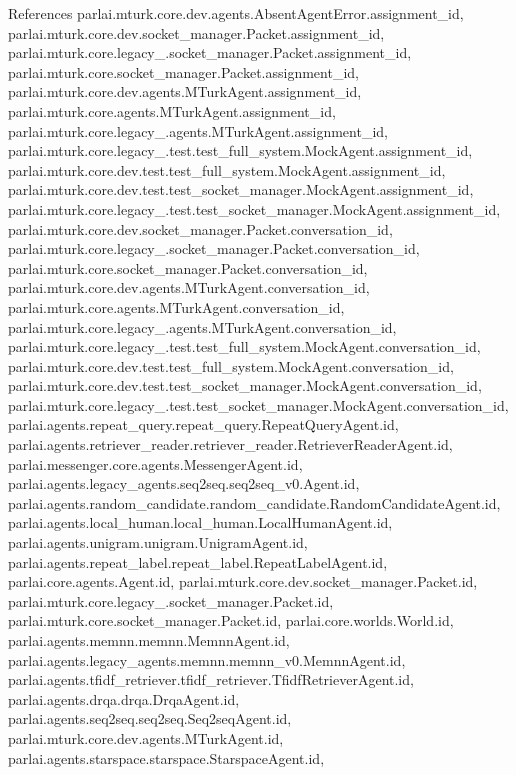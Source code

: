References parlai.\+mturk.\+core.\+dev.\+agents.\+Absent\+Agent\+Error.\+assignment\+\_\+id, parlai.\+mturk.\+core.\+dev.\+socket\+\_\+manager.\+Packet.\+assignment\+\_\+id, parlai.\+mturk.\+core.\+legacy\+\_.\+socket\+\_\+manager.\+Packet.\+assignment\+\_\+id, parlai.\+mturk.\+core.\+socket\+\_\+manager.\+Packet.\+assignment\+\_\+id, parlai.\+mturk.\+core.\+dev.\+agents.\+M\+Turk\+Agent.\+assignment\+\_\+id, parlai.\+mturk.\+core.\+agents.\+M\+Turk\+Agent.\+assignment\+\_\+id, parlai.\+mturk.\+core.\+legacy\+\_.\+agents.\+M\+Turk\+Agent.\+assignment\+\_\+id, parlai.\+mturk.\+core.\+legacy\+\_.\+test.\+test\+\_\+full\+\_\+system.\+Mock\+Agent.\+assignment\+\_\+id, parlai.\+mturk.\+core.\+dev.\+test.\+test\+\_\+full\+\_\+system.\+Mock\+Agent.\+assignment\+\_\+id, parlai.\+mturk.\+core.\+dev.\+test.\+test\+\_\+socket\+\_\+manager.\+Mock\+Agent.\+assignment\+\_\+id, parlai.\+mturk.\+core.\+legacy\+\_.\+test.\+test\+\_\+socket\+\_\+manager.\+Mock\+Agent.\+assignment\+\_\+id, parlai.\+mturk.\+core.\+dev.\+socket\+\_\+manager.\+Packet.\+conversation\+\_\+id, parlai.\+mturk.\+core.\+legacy\+\_.\+socket\+\_\+manager.\+Packet.\+conversation\+\_\+id, parlai.\+mturk.\+core.\+socket\+\_\+manager.\+Packet.\+conversation\+\_\+id, parlai.\+mturk.\+core.\+dev.\+agents.\+M\+Turk\+Agent.\+conversation\+\_\+id, parlai.\+mturk.\+core.\+agents.\+M\+Turk\+Agent.\+conversation\+\_\+id, parlai.\+mturk.\+core.\+legacy\+\_.\+agents.\+M\+Turk\+Agent.\+conversation\+\_\+id, parlai.\+mturk.\+core.\+legacy\+\_.\+test.\+test\+\_\+full\+\_\+system.\+Mock\+Agent.\+conversation\+\_\+id, parlai.\+mturk.\+core.\+dev.\+test.\+test\+\_\+full\+\_\+system.\+Mock\+Agent.\+conversation\+\_\+id, parlai.\+mturk.\+core.\+dev.\+test.\+test\+\_\+socket\+\_\+manager.\+Mock\+Agent.\+conversation\+\_\+id, parlai.\+mturk.\+core.\+legacy\+\_.\+test.\+test\+\_\+socket\+\_\+manager.\+Mock\+Agent.\+conversation\+\_\+id, parlai.\+agents.\+repeat\+\_\+query.\+repeat\+\_\+query.\+Repeat\+Query\+Agent.\+id, parlai.\+agents.\+retriever\+\_\+reader.\+retriever\+\_\+reader.\+Retriever\+Reader\+Agent.\+id, parlai.\+messenger.\+core.\+agents.\+Messenger\+Agent.\+id, parlai.\+agents.\+legacy\+\_\+agents.\+seq2seq.\+seq2seq\+\_\+v0.\+Agent.\+id, parlai.\+agents.\+random\+\_\+candidate.\+random\+\_\+candidate.\+Random\+Candidate\+Agent.\+id, parlai.\+agents.\+local\+\_\+human.\+local\+\_\+human.\+Local\+Human\+Agent.\+id, parlai.\+agents.\+unigram.\+unigram.\+Unigram\+Agent.\+id, parlai.\+agents.\+repeat\+\_\+label.\+repeat\+\_\+label.\+Repeat\+Label\+Agent.\+id, parlai.\+core.\+agents.\+Agent.\+id, parlai.\+mturk.\+core.\+dev.\+socket\+\_\+manager.\+Packet.\+id, parlai.\+mturk.\+core.\+legacy\+\_.\+socket\+\_\+manager.\+Packet.\+id, parlai.\+mturk.\+core.\+socket\+\_\+manager.\+Packet.\+id, parlai.\+core.\+worlds.\+World.\+id, parlai.\+agents.\+memnn.\+memnn.\+Memnn\+Agent.\+id, parlai.\+agents.\+legacy\+\_\+agents.\+memnn.\+memnn\+\_\+v0.\+Memnn\+Agent.\+id, parlai.\+agents.\+tfidf\+\_\+retriever.\+tfidf\+\_\+retriever.\+Tfidf\+Retriever\+Agent.\+id, parlai.\+agents.\+drqa.\+drqa.\+Drqa\+Agent.\+id, parlai.\+agents.\+seq2seq.\+seq2seq.\+Seq2seq\+Agent.\+id, parlai.\+mturk.\+core.\+dev.\+agents.\+M\+Turk\+Agent.\+id, parlai.\+agents.\+starspace.\+starspace.\+Starspace\+Agent.\+id, 